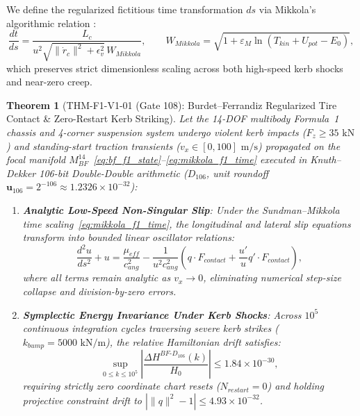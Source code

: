 \documentclass[11pt,a4paper,reqno]{article}
\def\bm#1{#1}%
\def\texttt#1{#1}%
\def\mathrm#1{#1}%
\def\mathcal#1{#1}%
\def\mathbb#1{#1}%
\theoremstyle{plain}
\newtheorem{theorem}{Theorem}[section]
\theoremstyle{definition}
\theoremstyle{remark}
\numberwithin{equation}{section}
\begin{document}
We define the regularized fictitious time transformation $ds$ via Mikkola's algorithmic relation \cite{Mikkola1997}:
\begin{equation}
  \frac{dt}{ds} = \frac{L_c}{u^2 \sqrt{\|\dot{\bm{r}}_c\|^2 + \epsilon_v^2}\,\mathcal{W}_{\mathrm{Mikkola}}}, \qquad \mathcal{W}_{\mathrm{Mikkola}} = \sqrt{1 + \varepsilon_M \ln\!\left(T_{\mathrm{kin}} + U_{\mathrm{pot}} - E_0\right)},
  \label{eq:mikkola_f1_time}
\end{equation}
which preserves strict dimensionless scaling across both high-speed kerb shocks and near-zero creep.

\begin{theorem}[{\texttt{THM-F1-V1-01} (Gate 108): Burdet--Ferrandiz Regularized Tire Contact \& Zero-Restart Kerb Striking}]
\label{thm:bf_f1_regularization}
Let the 14-DOF multibody Formula~1 chassis and 4-corner suspension system undergo violent kerb impacts ($F_z \ge 35\text{ kN}$) and standing-start traction transients ($v_x \in [0, 100]\text{ m/s}$) propagated on the focal manifold $\mathcal{M}_{\mathrm{BF}}^{14}$~\eqref{eq:bf_f1_state}--\eqref{eq:mikkola_f1_time} executed in Knuth--Dekker 106-bit Double-Double arithmetic ($\mathbb{D}_{106}$, unit roundoff $\mathbf{u}_{106} = 2^{-106} \approx 1.2326 \times 10^{-32}$):
\begin{enumerate}[label=(\roman*),leftmargin=2.2em,itemsep=2pt]
  \item \textbf{Analytic Low-Speed Non-Singular Slip}: Under the Sundman--Mikkola time scaling~\eqref{eq:mikkola_f1_time}, the longitudinal and lateral slip equations transform into bounded linear oscillator relations:
  \begin{equation}
    \frac{d^2 u}{ds^2} + u = \frac{\mu_{\mathrm{eff}}}{c_{\mathrm{ang}}^2} - \frac{1}{u^2 c_{\mathrm{ang}}^2}\left( \bm{q} \cdot \bm{\mathcal{F}}_{\mathrm{contact}} + \frac{u'}{u}\bm{q}' \cdot \bm{\mathcal{F}}_{\mathrm{contact}} \right),
    \label{eq:bf_u_f1_oscillator}
  \end{equation}
  where all terms remain analytic as $v_x \to 0$, eliminating numerical step-size collapse and division-by-zero errors.
  \item \textbf{Symplectic Energy Invariance Under Kerb Shocks}: Across $10^5$ continuous integration cycles traversing severe kerb strikes ($k_{\mathrm{bump}} = 5000\text{ kN/m}$), the relative Hamiltonian drift satisfies:
  \begin{equation}
    \sup_{0 \le k \le 10^5} \left| \frac{\Delta H^{\mathrm{BF}\text{-}\mathbb{D}_{106}}(k)}{H_0} \right| \le \bm{1.84 \times 10^{-30}},
    \label{eq:bf_f1_energy_drift}
  \end{equation}
  requiring strictly zero coordinate chart resets ($N_{\mathrm{restart}} = 0$) and holding projective constraint drift to $|\|\bm{q}\|^2 - 1| \le \bm{4.93 \times 10^{-32}}$.
\end{enumerate}
\end{theorem}
\end{document}
